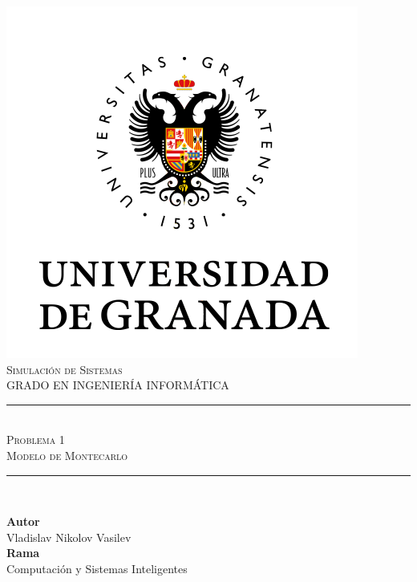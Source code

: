 \documentclass[11pt,a4paper]{article}
\newcommand{\asignatura}{Simulación de Sistemas}
\newcommand{\autor}{Vladislav Nikolov Vasilev}
\newcommand{\titulo}{Problema 1}
\newcommand{\subtitulo}{Modelo de Montecarlo}
\begin{document}

\begin{titlepage}

\begin{minipage}{\textwidth}

\centering

\includegraphics[scale=0.5]{img/ugr.png}\\

\textsc{\Large \asignatura{}\\[0.2cm]}
\textsc{GRADO EN INGENIERÍA INFORMÁTICA}\\[1cm]

\noindent\rule[-1ex]{\textwidth}{1pt}\\[1.5ex]
\textsc{{\Huge \titulo\\[0.5ex]}}
\textsc{{\Large \subtitulo\\}}
\noindent\rule[-1ex]{\textwidth}{2pt}\\[3.5ex]

\end{minipage}

\vspace{0.5cm}

\begin{minipage}{\textwidth}

\centering

\textbf{Autor}\\ {\autor{}}\\[2.5ex]
\textbf{Rama}\\ {Computación y Sistemas Inteligentes}\\[2.5ex]
\vspace{0.3cm}


\end{minipage}
\end{titlepage}
\end{document}
